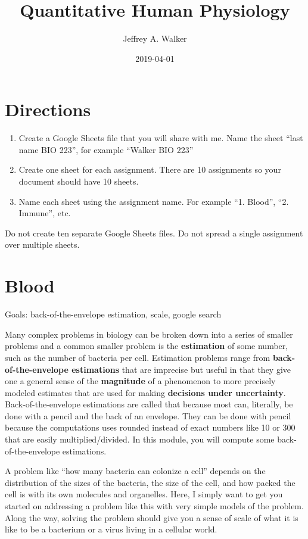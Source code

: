 \documentclass[]{book}
\title{Quantitative Human Physiology}
\author{Jeffrey A. Walker}
\date{2019-04-01}
\begin{document}
\maketitle

{
\setcounter{tocdepth}{1}
\tableofcontents
}
\chapter*{Directions}\label{directions}

\begin{enumerate}
\def\labelenumi{\arabic{enumi}.}
\item
  Create a Google Sheets file that you will share with me. Name the
  sheet ``last name BIO 223'', for example ``Walker BIO 223''
\item
  Create one sheet for each assignment. There are 10 assignments so your
  document should have 10 sheets.
\item
  Name each sheet using the assignment name. For example ``1. Blood'',
  ``2. Immune'', etc.
\end{enumerate}

Do not create ten separate Google Sheets files. Do not spread a single
assignment over multiple sheets.

\chapter{Blood}\label{blood}

Goals: back-of-the-envelope estimation, scale, google search

Many complex problems in biology can be broken down into a series of
smaller problems and a common smaller problem is the \textbf{estimation}
of some number, such as the number of bacteria per cell. Estimation
problems range from \textbf{back-of-the-envelope estimations} that are
imprecise but useful in that they give one a general sense of the
\textbf{magnitude} of a phenomenon to more precisely modeled estimates
that are used for making \textbf{decisions under uncertainty}.
Back-of-the-envelope estimations are called that because most can,
literally, be done with a pencil and the back of an envelope. They can
be done with pencil because the computations uses rounded instead of
exact numbers like 10 or 300 that are easily multiplied/divided. In this
module, you will compute some back-of-the-envelope estimations.

A problem like ``how many bacteria can colonize a cell'' depends on the
distribution of the sizes of the bacteria, the size of the cell, and how
packed the cell is with its own molecules and organelles. Here, I simply
want to get you started on addressing a problem like this with very
simple models of the problem. Along the way, solving the problem should
give you a sense of scale of what it is like to be a bacterium or a
virus living in a cellular world.
\end{document}
